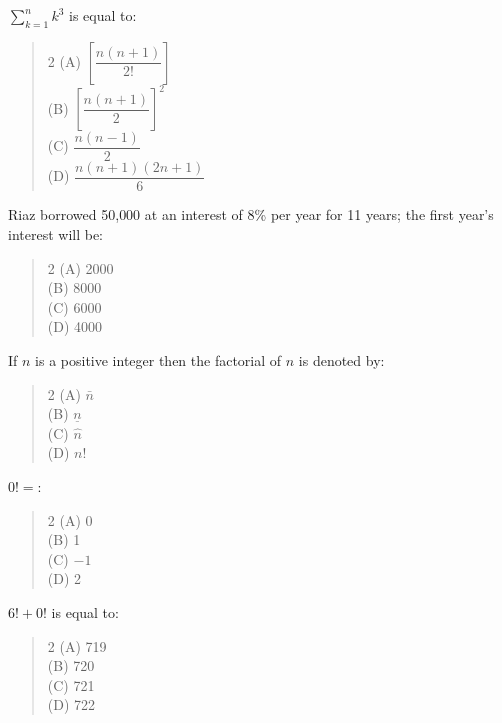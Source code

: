 \documentclass[11pt,a4paper]{article}
\begin{document}
\begin{mcqlist}
\item $\displaystyle\sum_{k=1}^n k^3$ is equal to:
\begin{quote}\begin{multicols}{2}
\noindent (A) $\left[\dfrac{n(n+1)}{2!}\right]$ \\
(B) $\left[\dfrac{n(n+1)}{2}\right]^2$ \\
(C) $\dfrac{n(n-1)}{2}$ \\
(D) $\dfrac{n(n+1)(2n+1)}{6}$
\end{multicols}\end{quote}

\item Riaz borrowed 50{,}000 at an interest of 8\% per year for 11 years; the first year's interest will be:
\begin{quote}\begin{multicols}{2}
\noindent (A) 2000 \\
(B) 8000 \\
(C) 6000 \\
(D) 4000
\end{multicols}\end{quote}

\item If $n$ is a positive integer then the factorial of $n$ is denoted by:
\begin{quote}\begin{multicols}{2}
\noindent (A) $\bar{n}$ \\
(B) $\underline{n}$ \\
(C) $\hat{n}$ \\
(D) $n!$
\end{multicols}\end{quote}

\item $0!=$:
\begin{quote}\begin{multicols}{2}
\noindent (A) 0 \\
(B) 1 \\
(C) $-1$ \\
(D) 2
\end{multicols}\end{quote}

\item $6!+0!$ is equal to:
\begin{quote}\begin{multicols}{2}
\noindent (A) 719 \\
(B) 720 \\
(C) 721 \\
(D) 722
\end{multicols}\end{quote}


\end{mcqlist}
\end{document}
